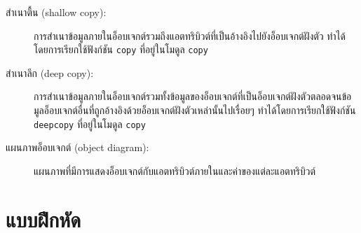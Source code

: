 \begin{description}
\item[สำเนาตื้น (shallow copy):] การสำเนาข้อมูลภายในอ็อบเจกต์รวมถึงแอตทริบิวต์ที่เป็นอ้างอิงไปยังอ็อบเจกต์ฝังตัว
ทำได้โดยการเรียกใช้ฟังก์ชัน {\tt copy} ที่อยู่ในโมดูล {\tt copy}


\item[สำเนาลึก (deep copy):] การสำเนาข้อมูลภายในอ็อบเจกต์รวมทั้งข้อมูลของอ็อบเจกต์ที่เป็นอ็อบเจกต์ฝังตัวตลอดจนข้อมูลอ็อบเจกต์อื่นที่ถูกอ้างอิงด้วยอ็อบเจกต์ฝังตัวเหล่านั้นไปเรื่อยๆ 
ทำได้โดยการเรียกใช้ฟังก์ชัน {\tt deepcopy} ที่อยู่ในโมดูล {\tt copy}


\item[แผนภาพอ็อบเจกต์ (object diagram):] แผนภาพที่มีการแสดงอ็อบเจกต์กับแอตทริบิวต์ภายในและค่าของแต่ละแอตทริบิวต์

\end{description}


\section{แบบฝึกหัด}


